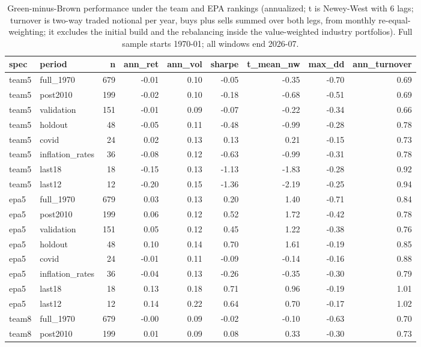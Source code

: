 \begin{table}
\caption{Green-minus-Brown performance under the team and EPA rankings (annualized; t is Newey-West with 6 lags; turnover is two-way traded notional per year, buys plus sells summed over both legs, from monthly re-equal-weighting; it excludes the initial build and the rebalancing inside the value-weighted industry portfolios). Full sample starts 1970-01; all windows end 2026-07.}
\label{tab:m4_perf}
\begin{tabular}{llrrrrrrr}
\toprule
spec & period & n & ann\_ret & ann\_vol & sharpe & t\_mean\_nw & max\_dd & ann\_turnover \\
\midrule
team5 & full\_1970 & 679 & -0.01 & 0.10 & -0.05 & -0.35 & -0.70 & 0.69 \\
team5 & post2010 & 199 & -0.02 & 0.10 & -0.18 & -0.68 & -0.51 & 0.69 \\
team5 & validation & 151 & -0.01 & 0.09 & -0.07 & -0.22 & -0.34 & 0.66 \\
team5 & holdout & 48 & -0.05 & 0.11 & -0.48 & -0.99 & -0.28 & 0.78 \\
team5 & covid & 24 & 0.02 & 0.13 & 0.13 & 0.21 & -0.15 & 0.73 \\
team5 & inflation\_rates & 36 & -0.08 & 0.12 & -0.63 & -0.99 & -0.31 & 0.78 \\
team5 & last18 & 18 & -0.15 & 0.13 & -1.13 & -1.83 & -0.28 & 0.92 \\
team5 & last12 & 12 & -0.20 & 0.15 & -1.36 & -2.19 & -0.25 & 0.94 \\
epa5 & full\_1970 & 679 & 0.03 & 0.13 & 0.20 & 1.40 & -0.71 & 0.84 \\
epa5 & post2010 & 199 & 0.06 & 0.12 & 0.52 & 1.72 & -0.42 & 0.78 \\
epa5 & validation & 151 & 0.05 & 0.12 & 0.45 & 1.22 & -0.38 & 0.76 \\
epa5 & holdout & 48 & 0.10 & 0.14 & 0.70 & 1.61 & -0.19 & 0.85 \\
epa5 & covid & 24 & -0.01 & 0.11 & -0.09 & -0.14 & -0.16 & 0.88 \\
epa5 & inflation\_rates & 36 & -0.04 & 0.13 & -0.26 & -0.35 & -0.30 & 0.79 \\
epa5 & last18 & 18 & 0.13 & 0.18 & 0.71 & 0.96 & -0.19 & 1.01 \\
epa5 & last12 & 12 & 0.14 & 0.22 & 0.64 & 0.70 & -0.17 & 1.02 \\
team8 & full\_1970 & 679 & -0.00 & 0.09 & -0.02 & -0.10 & -0.63 & 0.70 \\
team8 & post2010 & 199 & 0.01 & 0.09 & 0.08 & 0.33 & -0.30 & 0.73 \\

\end{tabular}
\end{table}
